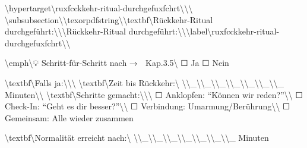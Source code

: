 \textbackslash{}hypertarget\textbackslash{}{ruxfcckkehr-ritual-durchgefuxfchrt\textbackslash{}}\textbackslash{}{\textbackslash{}%
\textbackslash{}subsubsection\textbackslash{}{\textbackslash{}texorpdfstring\textbackslash{}{\textbackslash{}textbf\textbackslash{}{Rückkehr-Ritual durchgeführt:\textbackslash{}}\textbackslash{}}\textbackslash{}{Rückkehr-Ritual durchgeführt:\textbackslash{}}\textbackslash{}}\textbackslash{}label\textbackslash{}{ruxfcckkehr-ritual-durchgefuxfchrt\textbackslash{}}\textbackslash{}}

\textbackslash{}emph\textbackslash{}{💡 Schritt-für-Schritt nach → 🔴 Kap.3.5\textbackslash{}} ☐ Ja ☐ Nein

\textbackslash{}textbf\textbackslash{}{Falls ja:\textbackslash{}}\textbackslash{}\textbackslash{}
\textbackslash{}textbf\textbackslash{}{Zeit bis Rückkehr:\textbackslash{}} \textbackslash{}\textbackslash{}_\textbackslash{}\textbackslash{}_\textbackslash{}\textbackslash{}_\textbackslash{}\textbackslash{}_\textbackslash{}\textbackslash{}_\textbackslash{}\textbackslash{}_\textbackslash{}\textbackslash{}_ Minuten\textbackslash{}\textbackslash{}
\textbackslash{}textbf\textbackslash{}{Schritte gemacht:\textbackslash{}}\textbackslash{}\textbackslash{}
☐ Anklopfen: ``Können wir reden?''\textbackslash{}\textbackslash{}
☐ Check-In: ``Geht es dir besser?''\textbackslash{}\textbackslash{}
☐ Verbindung: Umarmung/Berührung\textbackslash{}\textbackslash{}
☐ Gemeinsam: Alle wieder zusammen

\textbackslash{}textbf\textbackslash{}{Normalität erreicht nach:\textbackslash{}} \textbackslash{}\textbackslash{}_\textbackslash{}\textbackslash{}_\textbackslash{}\textbackslash{}_\textbackslash{}\textbackslash{}_\textbackslash{}\textbackslash{}_\textbackslash{}\textbackslash{}_\textbackslash{}\textbackslash{}_ Minuten

